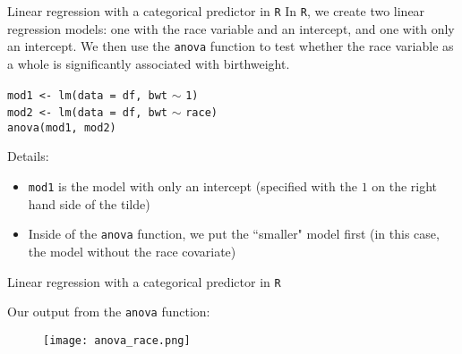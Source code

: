 \documentclass[10pt,t]{beamer}
\begin{document}
\begin{frame}{Linear regression with a categorical predictor in \texttt{R}}
In \texttt{R}, we create two linear regression models: one with the race variable and an intercept, and one with only an intercept. We then use the \texttt{anova} function to test whether the race variable as a whole is significantly associated with birthweight.

\vspace{0.3cm}

\texttt{mod1 <- lm(data = df, bwt} $\sim$ \texttt{1) \\
	mod2 <- lm(data = df, bwt} $\sim$ \texttt{race) \\
	anova(mod1, mod2)} \pause

\vspace{0.3cm}

Details:
\begin{itemize}
	\item \texttt{mod1} is the model with only an intercept (specified with the $1$ on the right hand side of the tilde)
	\item Inside of the \texttt{anova} function, we put the ``smaller" model first (in this case, the model without the race covariate)
\end{itemize}
\end{frame}

\begin{frame}{Linear regression with a categorical predictor in \texttt{R}}

\vspace{-5 mm}

Our output from the \texttt{anova} function:

\vspace{0.15cm}

\begin{figure}
	\centering \texttt{[image: anova\_race.png]}
\end{figure}

\end{frame}
\end{document}
